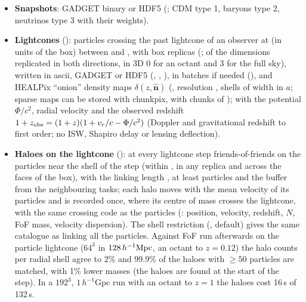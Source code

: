 \begin{itemize}
      $f\delta$ in linear theory (checked to 2--4\% below $3k_f$); ;  (particles,
      or linear theory on top of $\delta_{cb}$); and , $|\bm F_5|/|\bm F_N|$ with the gravity model's
      own screening method or exact solver (whose state for the next step is kept: the $P(k)$ are the same with and
      without images). Settings , , , ,
      , , , ,
      .
\item \textbf{Snapshots}: GADGET binary or HDF5 (; CDM type 1, baryons type 2, neutrinos
      type 3 with their weights).
\item \textbf{Lightcones} (): particles crossing the past lightcone of an observer at
       (in units of the box) between  and , with box
      replicas (;  of the dimensions replicated in both directions, in 3D 0 for
      an octant and 3 for the full sky), written in ascii, GADGET or HDF5 (,
      , ), in batches if needed (),
      and HEALPix ``onion'' density maps $\delta(z,\hat{\bm n})$ (, resolution
      , shells of width  in $a$; sparse maps can be stored with chunkpix,
       with chunks of ); with  the
      potential $\Phi/c^2$, radial velocity and the observed redshift $1+z_{\rm obs}=(1+z)(1+v_r/c-\Phi/c^2)$ (Doppler and
      gravitational redshift to first order; no ISW, Shapiro delay or lensing deflection).
\item \textbf{Haloes on the lightcone} (): at every lightcone step friends-of-friends on the particles
      near the shell of the step (within , in any replica and across the faces of the box), with
      the linking length , at least  particles and the
      buffer  from the neighbouring tasks;
      each halo moves with the mean velocity of its particles and is recorded once, where its centre of mass crosses the
      lightcone, with the same crossing code as the particles (: position, velocity, redshift,
      $N$, FoF mass, velocity dispersion). The shell restriction (, default) gives the same
      catalogue as linking all the particles.
      Against FoF run afterwards on the particle lightcone ($64^3$ in $128\,h^{-1}\mathrm{Mpc}$, an octant to $z=0.12$) the halo counts
      per radial shell agree to 2\% and 99.9\% of the haloes with $\geq50$ particles are matched, with 1\% lower masses
      (the haloes are found at the start of the step). In a $192^3$, $1\,h^{-1}$Gpc run with an octant to $z=1$ the haloes
      cost 16\,s of 132\,s.
\end{itemize}
